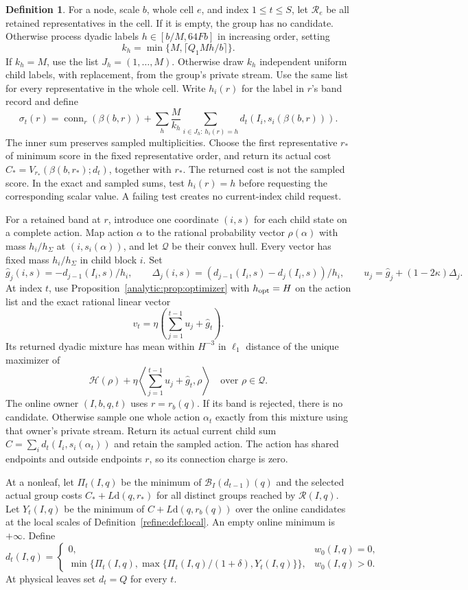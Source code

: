 \documentclass[11pt]{article}
\theoremstyle{definition}
\newtheorem{definition}[theorem]{Definition}
\newcommand{\conn}{\operatorname{conn}}
\newcommand{\dd}{\mathrm d}
\newcommand{\cB}{\mathcal B}
\newcommand{\cQ}{\mathcal Q}
\newcommand{\1}{\mathbf 1}
\newcommand{\HH}{\mathcal H}
\begin{document}
\begin{definition}\label{refine:def:update}
For a node, scale $b$, whole cell $e$, and index $1\le t\le S$, let
$\mathcal R_e$ be all retained representatives in the cell.
If it is empty, the group has no candidate. Otherwise process dyadic
labels $h\in[b/M,64Fb]$ in increasing order, setting
\[
 k_h=\min\{M,\lceil Q_1Mh/b\rceil\}.
\]
If $k_h=M$, use the list $J_h=(1,\ldots,M)$. Otherwise draw $k_h$
independent uniform child labels, with replacement, from the group's
private stream. Use the same list for every representative in the whole
cell. Write $h_i(r)$ for the label in $r$'s band record and define
\[
 \sigma_t(r)=\conn_r(\beta(b,r))+
 \sum_h\frac{M}{k_h}
 \sum_{i\in J_h:\,h_i(r)=h}d_t(I_i,s_i(\beta(b,r))).
\]
The inner sum preserves sampled multiplicities. Choose the first
representative $r_*$ of minimum score in the fixed representative order,
and return its actual cost
$C_*=V_{r_*}(\beta(b,r_*);d_t)$, together with $r_*$.
The returned cost is not the sampled score. In the exact and sampled
sums, test $h_i(r)=h$ before requesting the corresponding scalar value.
A failing test creates no current-index child request.

For a retained band at $r$, introduce one coordinate $(i,s)$ for each
child state on a complete action. Map action $\alpha$ to the rational
probability vector $\rho(\alpha)$ with mass $h_i/h_\Sigma$ at
$(i,s_i(\alpha))$, and let $\cQ$ be their convex hull. Every vector has
fixed mass $h_i/h_\Sigma$ in child block $i$. Set
\[
 \widehat g_j(i,s)=-d_{j-1}(I_i,s)/h_i,\qquad
 \Delta_j(i,s)=(d_{j-1}(I_i,s)-d_j(I_i,s))/h_i,
 \qquad u_j=\widehat g_j+(1-2\kappa)\Delta_j.
\]
At index $t$, use Proposition~\ref{analytic:prop:optimizer} with
$h_{\rm opt}=H$ on the action list and the exact rational linear vector
\[
 v_t=\eta\left(\sum_{j=1}^{t-1}u_j+\widehat g_t\right).
\]
Its returned dyadic mixture has mean within $H^{-3}$ in $\ell_1$
distance of the unique maximizer of
\[
 \HH(\rho)+\eta\left\langle
 \sum_{j=1}^{t-1}u_j+\widehat g_t,\rho\right\rangle
 \quad\text{over }\rho\in\cQ.
\]
The online owner $(I,b,q,t)$ uses $r=r_b(q)$. If its band is rejected,
there is no candidate. Otherwise sample one whole action $\alpha_t$
exactly from this mixture using that owner's private stream. Return
its actual current child sum
$C=\sum_i d_t(I_i,s_i(\alpha_t))$ and retain the sampled action.
The action has shared endpoints and outside endpoints $r$, so its
connection charge is zero.

At a nonleaf, let $\Pi_t(I,q)$ be the minimum of
$\cB_I(d_{t-1})(q)$ and the selected actual group costs
$C_*+L\dd(q,r_*)$ for all distinct groups reached by
$\mathcal R(I,q)$. Let $Y_t(I,q)$ be the minimum of
$C+L\dd(q,r_b(q))$ over the online candidates at the local scales
of Definition~\ref{refine:def:local}. An empty online minimum is
$+\infty$. Define
\[
 d_t(I,q)=
 \begin{cases}
 0,&w_0(I,q)=0,\\
 \min\{\Pi_t(I,q),
       \max\{\Pi_t(I,q)/(1+\delta),Y_t(I,q)\}\},&w_0(I,q)>0.
 \end{cases}
\]
At physical leaves set $d_t=Q$ for every $t$.
\end{definition}
\end{document}
